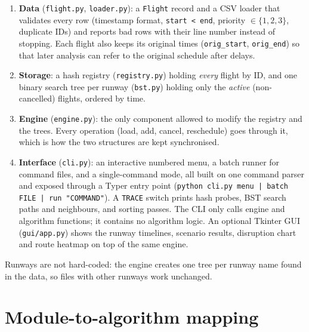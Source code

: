 \documentclass[11pt]{article}
\begin{document}
\begin{enumerate}
  \item \textbf{Data} (\texttt{flight.py}, \texttt{loader.py}): a \texttt{Flight}
  record and a CSV loader that validates every row (timestamp format,
  \texttt{start < end}, priority $\in\{1,2,3\}$, duplicate IDs) and reports bad
  rows with their line number instead of stopping. Each flight also keeps its
  original times (\texttt{orig\_start}, \texttt{orig\_end}) so that later
  analysis can refer to the original schedule after delays.
  \item \textbf{Storage}: a hash registry (\texttt{registry.py}) holding
  \emph{every} flight by ID, and one binary search tree per runway
  (\texttt{bst.py}) holding only the \emph{active} (non-cancelled) flights,
  ordered by time.
  \item \textbf{Engine} (\texttt{engine.py}): the only component allowed to
  modify the registry and the trees. Every operation (load, add, cancel,
  reschedule) goes through it, which is how the two structures are kept
  synchronised.
  \item \textbf{Interface} (\texttt{cli.py}): an interactive numbered menu, a
  batch runner for command files, and a single-command mode, all built on one
  command parser and exposed through a Typer entry point
  (\texttt{python cli.py menu | batch FILE | run "COMMAND"}). A \texttt{TRACE}
  switch prints hash probes, BST search paths and neighbours, and sorting
  passes. The CLI only calls engine and algorithm functions; it contains no
  algorithm logic. An optional Tkinter GUI (\texttt{gui/app.py}) shows the
  runway timelines, scenario results, disruption chart and route heatmap on
  top of the same engine.
\end{enumerate}

Runways are not hard-coded: the engine creates one tree per runway name found in
the data, so files with other runways work unchanged.

\section{Module-to-algorithm mapping}
\end{document}
